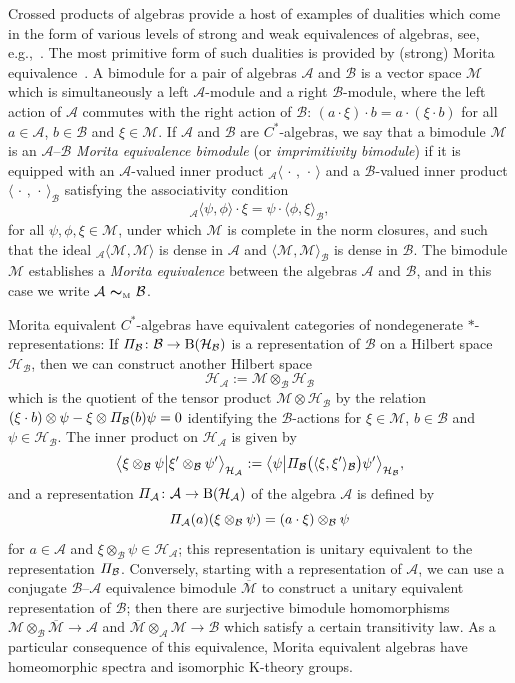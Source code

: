 \documentclass[pdftex]{sigma}
\numberwithin{equation}{section}
\newcommand{\mbf}[1]{{\boldsymbol {#1} }}
\newcommand{\Pim}{{\mit\Pi}}
\newcommand{\rmB}{{\rm B}}
\def\alg{{\mathcal A}}
\def\balg{{\mathcal B}}
\def\hil{{\mathcal H}}
\def\Mcal{{\mathcal M}}
\begin{document}
Crossed products of algebras provide a host of examples of dualities
which come in the form of various levels of strong and weak
equivalences of algebras, see, e.g.,~\cite{Brodzki2006}. The most
primitive form of such dualities is provided by (strong) Morita
equivalence~\cite{Rieffel1974}. A bimodule for a pair of algebras $\alg$ and $\balg$ is a
vector space $\Mcal$ which is simultaneously
 a left $\alg$-module and a right $\balg$-module, where the left action
 of $\alg$ commutes with the right action of $\balg$: $(a\cdot\xi)\cdot
 b=a\cdot (\xi\cdot b)$ for all $a\in \alg$, $b\in
 \balg$ and $\xi\in \Mcal$. If $\alg$ and $\balg$ are $C^*$-algebras,
 we say that a bimodule $\Mcal$ is an $\alg$--$\balg$ \emph{Morita
 equivalence bimodule} (or \emph{imprimitivity bimodule}) if it
is equipped with an $\alg$-valued inner product
${}_\alg\langle\,\cdot\,,\,\cdot\,\rangle$ and a $\balg$-valued inner
product $\langle\,\cdot\,,\,\cdot\,\rangle_\balg$ satisfying the
associativity condition
\[
{}_\alg\langle \psi,\phi\rangle \cdot \xi =
\psi\cdot\langle\phi,\xi\rangle_\balg ,
\]
for all $\psi,\phi,\xi\in\Mcal$, under which $\Mcal$ is complete in
the norm closures, and such that the ideal ${}_\alg\langle
\Mcal,\Mcal\rangle$ is dense in $\alg$ and $\langle
\Mcal,\Mcal\rangle_\balg$ is dense in $\balg$. The bimodule $\Mcal$ establishes a
\emph{Morita equivalence} between the algebras $\alg$ and $\balg$, and
in this case we write $\alg\ \mbf\sim_{\text{\tiny M}}\ \balg$.

Morita equivalent $C^*$-algebras have equivalent categories of
nondegenerate $*$-representations: If $\Pim_\balg\colon \balg\to{\rm B}(\hil_\balg)$ is a
representation of $\balg$ on a Hilbert space $\hil_\balg$, then we can
construct another Hilbert space
\[
\hil_\alg:=\Mcal\otimes_\balg\hil_\balg
\]
which is the quotient of the tensor product $\Mcal\otimes\hil_\balg$ by the relation $(\xi\cdot
b)\otimes\psi-\xi\otimes\Pim_\balg(b)\psi=0$ identifying the
$\balg$-actions for
$\xi\in\Mcal$, $b\in\balg$ and $\psi\in\hil_\balg$. The inner product
on $\hil_\alg$ is given by
\[
\big\langle\xi\otimes_\balg\psi\big|
\xi'\otimes_\balg\psi'\big\rangle_{\hil_\alg} :=
\big\langle\psi\big|\Pim_\balg\big(\langle\xi,\xi'\rangle_\balg
\big)\psi'\big\rangle_{\hil_\balg} ,
\]
and a representation $\Pim_\alg\colon \alg\to\rmB(\hil_\alg)$ of the algebra
$\alg$ is defined by
\[
\Pim_\alg(a)(\xi\otimes_\balg\psi) = (a\cdot\xi) \otimes_\balg\psi
\]
for $a\in\alg$ and $\xi\otimes_\balg\psi\in\hil_\alg$; this
representation is unitary equivalent to the representation
$\Pim_\balg$. Conversely, starting with a representation of $\alg$, we
can use a conjugate $\balg$--$\alg$ equivalence bimodule
$\overline{\Mcal}$ to construct a unitary equivalent representation of
$\balg$; then there are surjective bimodule homomorphisms
$\Mcal\otimes_\balg\overline{\Mcal}\to\alg$ and
$\overline{\Mcal}\otimes_\alg\Mcal\to\balg$ which satisfy a certain
transitivity law. As a particular consequence of this equivalence, Morita
equivalent algebras have homeomorphic spectra and isomorphic K-theory groups.
\end{document}
